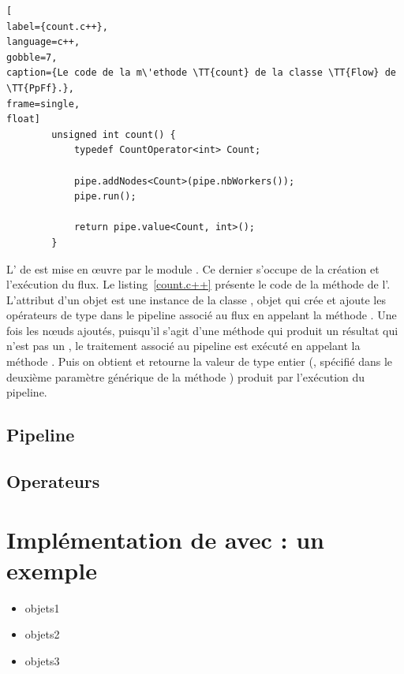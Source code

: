 \begin{lstlisting}[
label={count.c++},
language=c++,
gobble=7,
caption={Le code de la m\'ethode \TT{count} de la classe \TT{Flow} de \TT{PpFf}.},
frame=single,
float]
        unsigned int count() {
            typedef CountOperator<int> Count;
            
            pipe.addNodes<Count>(pipe.nbWorkers());
            pipe.run();

            return pipe.value<Count, int>();
        }
\end{lstlisting}






L' de  est mise en œuvre par le module . Ce dernier s'occupe de la cr\'eation et l'ex\'ecution du flux. Le listing~\ref{count.c++} pr\'esente le code de la m\'ethode  de l'. L'attribut  d'un objet  est une instance de la classe , objet qui cr\'ee et ajoute les op\'erateurs de type  dans le pipeline associé au flux en appelant la m\'ethode . Une fois les n\oe{}uds ajoutés, puisqu'il s'agit d'une méthode qui produit un résultat qui n'est pas un , le traitement associé au pipeline  est ex\'ecut\'e en appelant la m\'ethode . Puis on obtient et retourne la valeur de type entier (, sp\'ecifi\'e dans le deuxi\`eme param\`etre générique de la m\'ethode ) produit par l'exécution du pipeline.

\subsection{Pipeline}
\subsection{Operateurs}


\section{Impl\'ementation de  avec  : un exemple}


\begin{itemize}

\item objets1 

\item objets2 

\item objets3 


\end{itemize}
